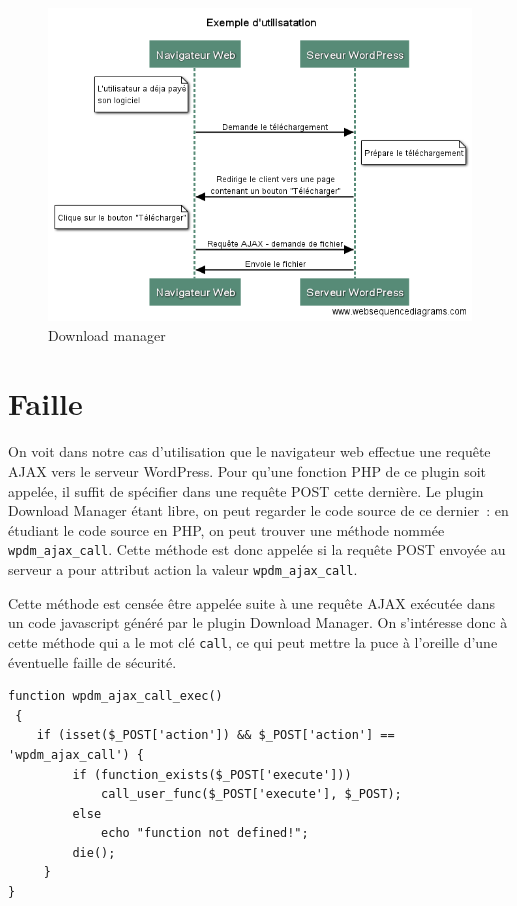 \documentclass[a4paper,oneside,10pt]{article}
\begin{document}
\newpage
\begin{figure}[ht]
\centering
\includegraphics[width=\textwidth]{img/sequence.png}
\caption{Download manager}
\label{sequence}
\end{figure} 

\section{Faille}
On voit dans notre cas d’utilisation que le navigateur web effectue une requête AJAX vers le serveur WordPress. Pour qu’une fonction PHP de ce plugin soit appelée, il suffit de spécifier dans une requête POST cette dernière. Le plugin Download Manager étant libre, on peut regarder le code source de ce dernier~: en étudiant le code source en PHP, on peut trouver une méthode nommée \texttt{wpdm\_ajax\_call}. Cette méthode est donc appelée si la requête POST envoyée au serveur a pour attribut action la valeur \texttt{wpdm\_ajax\_call}. 

Cette méthode est censée être appelée suite à une requête AJAX exécutée dans un code javascript généré par le plugin Download Manager. On s’intéresse donc à cette méthode qui a le mot clé \texttt{call}, ce qui peut mettre la puce à l’oreille d’une éventuelle faille de sécurité. 

\begin{verbatim}
function wpdm_ajax_call_exec()
 {
    if (isset($_POST['action']) && $_POST['action'] == 'wpdm_ajax_call') {
         if (function_exists($_POST['execute']))
             call_user_func($_POST['execute'], $_POST);
         else
             echo "function not defined!";
         die();
     }
}
\end{verbatim}
\end{document}
